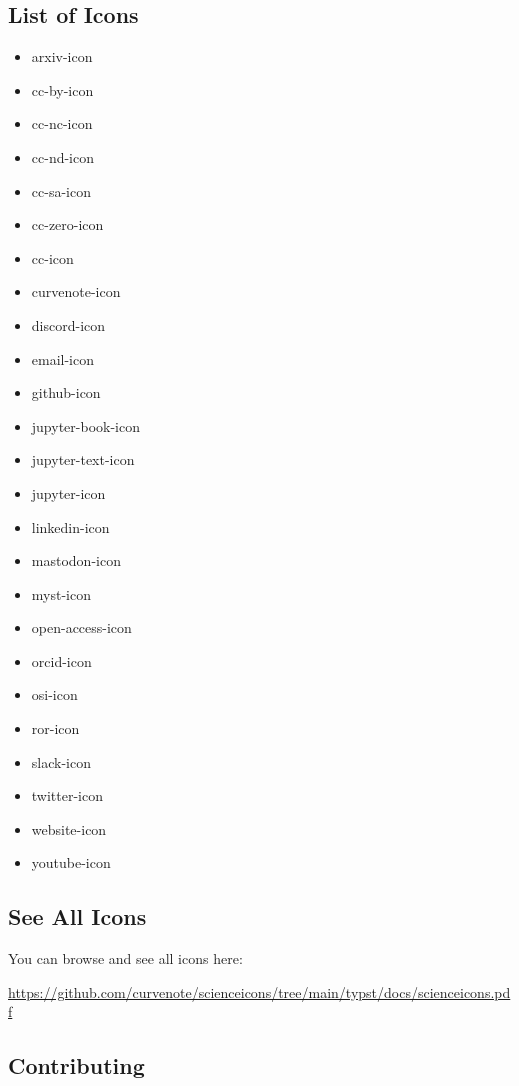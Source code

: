 \subsection{List of Icons}\label{list-of-icons}

\begin{itemize}
\tightlist
\item
  arxiv-icon
\item
  cc-by-icon
\item
  cc-nc-icon
\item
  cc-nd-icon
\item
  cc-sa-icon
\item
  cc-zero-icon
\item
  cc-icon
\item
  curvenote-icon
\item
  discord-icon
\item
  email-icon
\item
  github-icon
\item
  jupyter-book-icon
\item
  jupyter-text-icon
\item
  jupyter-icon
\item
  linkedin-icon
\item
  mastodon-icon
\item
  myst-icon
\item
  open-access-icon
\item
  orcid-icon
\item
  osi-icon
\item
  ror-icon
\item
  slack-icon
\item
  twitter-icon
\item
  website-icon
\item
  youtube-icon
\end{itemize}

\subsection{See All Icons}\label{see-all-icons}

You can browse and see all icons here:

\url{https://github.com/curvenote/scienceicons/tree/main/typst/docs/scienceicons.pdf}

\pandocbounded{\texttt{[image: https://raw.githubusercontent.com/curvenote/scienceicons/main/typst/docs/icons.png?raw=true]}}

\subsection{Contributing}\label{contributing}

